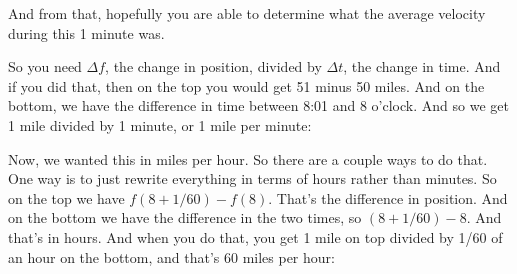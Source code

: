 \documentclass[pdftex, brazil, 12pt, twoside]{article}
\begin{document}
\begin{figure}[H]
  \begin{center}
  \end{center}
\end{figure}

And from that, hopefully you are able to determine
what the average velocity during this 1 minute was.

So you need $\Delta f$, the change in position,
divided by $\Delta t$, the change in time.
And if you did that, then on the top
you would get 51 minus 50 miles.
And on the bottom, we have the difference
in time between 8:01 and 8 o'clock.
And so we get 1 mile divided by 1 minute, or 1 mile per minute:

\begin{figure}[H]
  \begin{center}
  \end{center}
\end{figure}

Now, we wanted this in miles per hour.
So there are a couple ways to do that.
One way is to just rewrite everything in terms of hours
rather than minutes.
So on the top we have $f(8 + 1/60) - f(8)$.
That's the difference in position.
And on the bottom we have the difference in the two
times, so $(8 + 1/60) - 8$.
And that's in hours.
And when you do that, you get 1 mile
on top divided by 1/60 of an hour on the bottom,
and that's 60 miles per hour:
\end{document}
